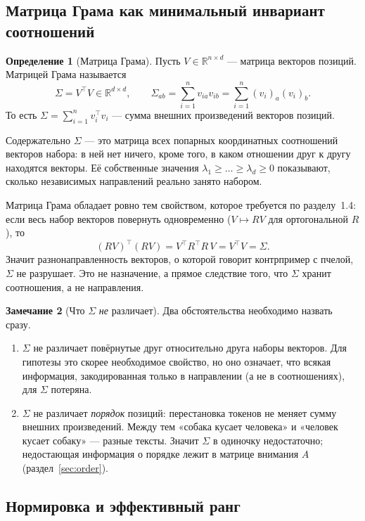 \documentclass[11pt,a4paper]{article}
\theoremstyle{definition}
\newtheorem{definition}{Определение}[section]
\newtheorem{remark}[definition]{Замечание}
\theoremstyle{plain}
\newcommand{\R}{\mathbb{R}}
\begin{document}
\subsection{Матрица Грама как минимальный инвариант соотношений}

\begin{definition}[Матрица Грама]
Пусть $V\in\R^{n\times d}$ — матрица векторов позиций. Матрицей Грама называется
\[
\Sigma=V^\top V\in\R^{d\times d},\qquad
\Sigma_{ab}=\sum_{i=1}^{n} v_{ia}v_{ib}=\sum_{i=1}^{n} (v_i)_a (v_i)_b .
\]
То есть $\Sigma=\sum_{i=1}^{n}v_i^\top v_i$ — сумма внешних произведений векторов позиций.
\end{definition}

Содержательно $\Sigma$ — это матрица всех попарных координатных соотношений векторов набора:
в ней нет ничего, кроме того, в каком отношении друг к другу находятся векторы. Её
собственные значения $\lambda_1\ge\dots\ge\lambda_d\ge 0$ показывают, сколько независимых
направлений реально занято набором.

Матрица Грама обладает ровно тем свойством, которое требуется по разделу~1.4: если весь набор
векторов повернуть одновременно ($V\mapsto RV$ для ортогональной $R$), то
\[
(RV)^\top(RV)=V^\top R^\top R\,V=V^\top V=\Sigma .
\]
Значит разнонаправленность векторов, о которой говорит контрпример с пчелой, $\Sigma$ не
разрушает. Это не назначение, а прямое следствие того, что $\Sigma$ хранит соотношения, а не
направления.

\begin{remark}[Что $\Sigma$ \emph{не} различает]
Два обстоятельства необходимо назвать сразу.
\begin{enumerate}[label=(\alph*)]
\item $\Sigma$ не различает повёрнутые друг относительно друга наборы векторов. Для гипотезы
это скорее необходимое свойство, но оно означает, что всякая информация, закодированная
только в направлении (а не в соотношениях), для $\Sigma$ потеряна.
\item $\Sigma$ не различает \emph{порядок} позиций: перестановка токенов не меняет сумму
внешних произведений. Между тем «собака кусает человека» и «человек кусает собаку» — разные
тексты. Значит $\Sigma$ в одиночку недостаточно; недостающая информация о порядке лежит в
матрице внимания $A$ (раздел~\ref{sec:order}).
\end{enumerate}
\end{remark}

\subsection{Нормировка и эффективный ранг}
\end{document}
